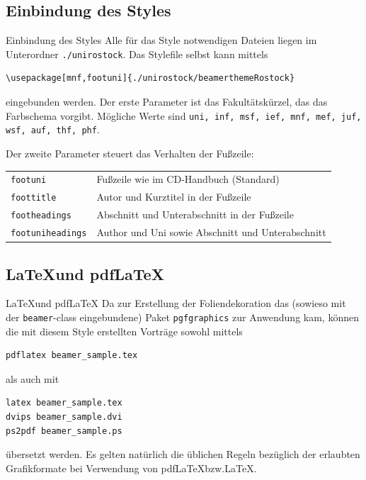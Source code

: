 \documentclass[10pt]{beamer} %
\begin{document}
\subsection{Einbindung des Styles}
\begin{frame}[fragile]{Einbindung des Styles}%
   Alle f\"ur das Style notwendigen Dateien liegen im Unterordner \texttt{./unirostock}.
   Das Stylefile selbst kann mittels
   \begin{verbatim}
\usepackage[mnf,footuni]{./unirostock/beamerthemeRostock}
   \end{verbatim}\vspace*{-0.5cm}
   eingebunden werden. Der erste Parameter ist das Fakult\"atsk\"urzel, das das Farbschema vorgibt.
   M\"ogliche Werte sind \texttt{uni, inf, msf, ief, mnf, mef, juf, wsf, auf, thf, phf}.

   Der zweite Parameter steuert das Verhalten der Fu{\ss}zeile:
   \begin{tabular}{lp{}}
     \texttt{footuni}   & Fu{\ss}zeile wie im CD-Handbuch (Standard)\\
     \texttt{foottitle} & Autor und Kurztitel in der Fu{\ss}zeile \\
     \texttt{footheadings} & Abschnitt und Unterabschnitt in der Fu{\ss}zeile \\
     \texttt{footuniheadings} & Author und Uni sowie Abschnitt und Unterabschnitt
   \end{tabular}
\end{frame}


\subsection{\LaTeX und pdf\LaTeX}
\begin{frame}[fragile]{\LaTeX und pdf\LaTeX}
  Da zur Erstellung der Foliendekoration das (sowieso mit der \verb+beamer+-class eingebundene) Paket \verb+pgfgraphics+ zur Anwendung kam, k\"onnen die mit diesem Style erstellten Vortr\"age sowohl mittels
  \begin{verbatim}
pdflatex beamer_sample.tex
  \end{verbatim}
  als auch mit
  \begin{verbatim}
latex beamer_sample.tex
dvips beamer_sample.dvi
ps2pdf beamer_sample.ps
  \end{verbatim}
  \"ubersetzt werden. Es gelten nat\"urlich die \"ublichen Regeln bez\"uglich der erlaubten Grafikformate bei Verwendung von pdf\LaTeX bzw.\LaTeX.
\end{frame}
\end{document}
